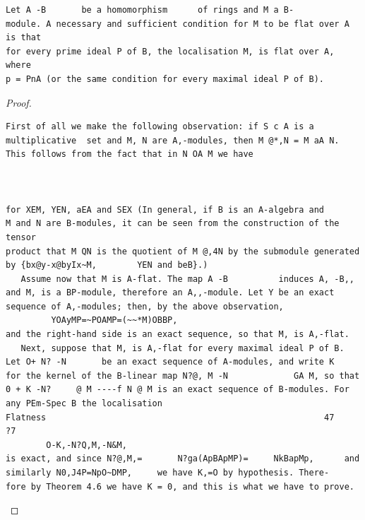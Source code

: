 \begin{theorem}\label{mcrt-auto-theorem-7-1}\uses{}
\begin{verbatim}
Let A -B       be a homomorphism      of rings and M a B-
module. A necessary and sufficient condition for M to be flat over A is that
for every prime ideal P of B, the localisation M, is flat over A, where
p = PnA (or the same condition for every maximal ideal P of B).
\end{verbatim}
\end{theorem}
\begin{proof}
\begin{verbatim}
First of all we make the following observation: if S c A is a
multiplicative  set and M, N are A,-modules, then M @*,N = M aA N.
This follows from the fact that in N OA M we have



for XEM, YEN, aEA and SEX (In general, if B is an A-algebra and
M and N are B-modules, it can be seen from the construction of the tensor
product that M QN is the quotient of M @,4N by the submodule generated
by {bx@y-x@byIx~M,        YEN and beB}.)
   Assume now that M is A-flat. The map A -B          induces A, -B,,
and M, is a BP-module, therefore an A,,-module. Let Y be an exact
sequence of A,-modules; then, by the above observation,
         YOAyMP=~POAMP=(~~*M)OBBP,
and the right-hand side is an exact sequence, so that M, is A,-flat.
   Next, suppose that M, is A,-flat for every maximal ideal P of B.
Let O+ N? -N       be an exact sequence of A-modules, and write K
for the kernel of the B-linear map N?@, M -N             GA M, so that
0 + K -N?     @ M ----f N @ M is an exact sequence of B-modules. For
any PEm-Spec B the localisation
Flatness                                                       47
?7
        O-K,-N?Q,M,-N&M,
is exact, and since N?@,M,=       N?ga(ApBApMP)=     NkBapMp,      and
similarly N0,J4P=NpO~DMP,     we have K,=O by hypothesis. There-
fore by Theorem 4.6 we have K = 0, and this is what we have to prove.
\end{verbatim}
\end{proof}


